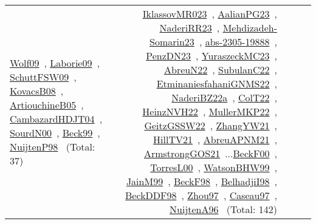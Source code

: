 {\begin{longtable}{p{3cm}r>{\raggedright\arraybackslash}p{6cm}>{\raggedright\arraybackslash}p{6cm}>{\raggedright\arraybackslash}p{8cm}}
\href{../works/Wolf09.pdf}{Wolf09}~\cite{Wolf09}, \href{../works/Laborie09.pdf}{Laborie09}~\cite{Laborie09}, \href{../works/SchuttFSW09.pdf}{SchuttFSW09}~\cite{SchuttFSW09}, \href{../works/KovacsB08.pdf}{KovacsB08}~\cite{KovacsB08}, \href{../works/ArtiouchineB05.pdf}{ArtiouchineB05}~\cite{ArtiouchineB05}, \href{../works/CambazardHDJT04.pdf}{CambazardHDJT04}~\cite{CambazardHDJT04}, \href{../works/SourdN00.pdf}{SourdN00}~\cite{SourdN00}, \href{../works/Beck99.pdf}{Beck99}~\cite{Beck99}, \href{../works/NuijtenP98.pdf}{NuijtenP98}~\cite{NuijtenP98} (Total: 37) & \href{../works/IklassovMR023.pdf}{IklassovMR023}~\cite{IklassovMR023}, \href{../works/AalianPG23.pdf}{AalianPG23}~\cite{AalianPG23}, \href{../works/NaderiRR23.pdf}{NaderiRR23}~\cite{NaderiRR23}, \href{../works/Mehdizadeh-Somarin23.pdf}{Mehdizadeh-Somarin23}~\cite{Mehdizadeh-Somarin23}, \href{../works/abs-2305-19888.pdf}{abs-2305-19888}~\cite{abs-2305-19888}, \href{../works/PenzDN23.pdf}{PenzDN23}~\cite{PenzDN23}, \href{../works/YuraszeckMC23.pdf}{YuraszeckMC23}~\cite{YuraszeckMC23}, \href{../works/AbreuN22.pdf}{AbreuN22}~\cite{AbreuN22}, \href{../works/SubulanC22.pdf}{SubulanC22}~\cite{SubulanC22}, \href{../works/EtminaniesfahaniGNMS22.pdf}{EtminaniesfahaniGNMS22}~\cite{EtminaniesfahaniGNMS22}, \href{../works/NaderiBZ22a.pdf}{NaderiBZ22a}~\cite{NaderiBZ22a}, \href{../works/ColT22.pdf}{ColT22}~\cite{ColT22}, \href{../works/HeinzNVH22.pdf}{HeinzNVH22}~\cite{HeinzNVH22}, \href{../works/MullerMKP22.pdf}{MullerMKP22}~\cite{MullerMKP22}, \href{../works/GeitzGSSW22.pdf}{GeitzGSSW22}~\cite{GeitzGSSW22}, \href{../works/ZhangYW21.pdf}{ZhangYW21}~\cite{ZhangYW21}, \href{../works/HillTV21.pdf}{HillTV21}~\cite{HillTV21}, \href{../works/AbreuAPNM21.pdf}{AbreuAPNM21}~\cite{AbreuAPNM21}, \href{../works/ArmstrongGOS21.pdf}{ArmstrongGOS21}~\cite{ArmstrongGOS21}...\href{../works/BeckF00.pdf}{BeckF00}~\cite{BeckF00}, \href{../works/TorresL00.pdf}{TorresL00}~\cite{TorresL00}, \href{../works/WatsonBHW99.pdf}{WatsonBHW99}~\cite{WatsonBHW99}, \href{../works/JainM99.pdf}{JainM99}~\cite{JainM99}, \href{../works/BeckF98.pdf}{BeckF98}~\cite{BeckF98}, \href{../works/BelhadjiI98.pdf}{BelhadjiI98}~\cite{BelhadjiI98}, \href{../works/BeckDDF98.pdf}{BeckDDF98}~\cite{BeckDDF98}, \href{../works/Zhou97.pdf}{Zhou97}~\cite{Zhou97}, \href{../works/Caseau97.pdf}{Caseau97}~\cite{Caseau97}, \href{../works/NuijtenA96.pdf}{NuijtenA96}~\cite{NuijtenA96} (Total: 142)\\

\end{longtable}}
